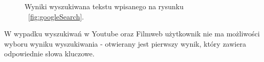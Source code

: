 \documentclass[twoside,a4paper]{book}
\begin{document}
	\begin{figure}
		\centering
		\caption{Wyniki wyszukiwana tekstu wpisanego na rysunku ~\ref{fig:googleSearch}.}
		\label{fig:searchResult}
		\end{figure}
		
W wypadku wyszukiwań w Youtube oraz Filmweb użytkownik nie ma możliwości wyboru  wyniku wyszukiwania - otwierany jest pierwszy wynik, który zawiera odpowiednie słowa kluczowe.
\end{document}
